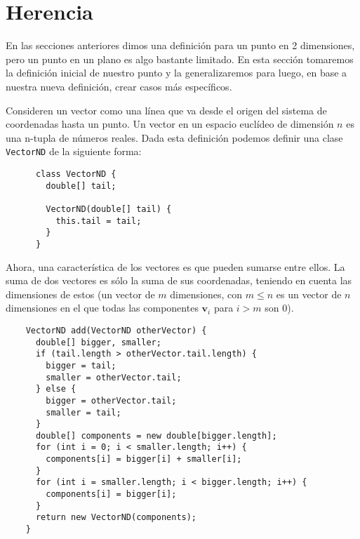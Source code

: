 \section{Herencia}

  En las secciones anteriores dimos una definición para un punto en 2 dimensiones, pero un 
  punto en un plano es algo bastante limitado.
  En esta sección tomaremos la definición inicial de nuestro punto y la generalizaremos 
  para luego, en base a nuestra nueva definición, crear casos más específicos.

  Consideren un vector como una línea que va desde el origen del sistema de coordenadas 
  hasta un punto.
  Un vector en un espacio euclídeo de dimensión \(n\) es una n-tupla de números reales.
  Dada esta definición podemos definir una clase \texttt{VectorND} de la siguiente forma:
  
  \begin{listing}[ht!]
    \begin{verbatim}
      class VectorND {
        double[] tail;
        
        VectorND(double[] tail) {
          this.tail = tail;
        }
      }
    \end{verbatim}
  \end{listing}

  Ahora, una característica de los vectores es que pueden sumarse entre ellos.
  La suma de dos vectores es sólo la suma de sus coordenadas, teniendo en cuenta las 
  dimensiones de estos (un vector de \(m\) dimensiones, con \(m \leq n\) es un vector de 
  \(n\) dimensiones en el que todas las componentes \(\mathbf{v}_i\) para \(i > m\) son 
  0).

  \begin{verbatim}
    VectorND add(VectorND otherVector) {
      double[] bigger, smaller;
      if (tail.length > otherVector.tail.length) {
        bigger = tail;
        smaller = otherVector.tail;
      } else {
        bigger = otherVector.tail;
        smaller = tail;
      }
      double[] components = new double[bigger.length];
      for (int i = 0; i < smaller.length; i++) {
        components[i] = bigger[i] + smaller[i];
      }
      for (int i = smaller.length; i < bigger.length; i++) {
        components[i] = bigger[i];
      }
      return new VectorND(components);
    }
  \end{verbatim}
  
